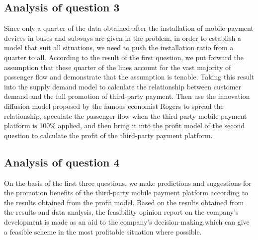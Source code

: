 \documentclass[../mcmpaper]{subfiles}
\begin{document}
\subsection{Analysis of question 3}
Since only a quarter of the data obtained after the installation of mobile payment devices in buses and subways are given in the problem, in order to establish a model that suit all situations, we need to push the installation ratio from a quarter to all. According to the result of the first question, we put forward the assumption that these quarter of the lines account for the vast majority of passenger flow and demonstrate that the assumption is tenable. Taking this result into the supply demand model to calculate the relationship between customer demand and the full promotion of third-party payment. Then use the innovation diffusion model proposed by the famous economist Rogers to spread the relationship, speculate the passenger flow when the third-party mobile payment platform is 100\% applied, and then bring it into the profit model of the second question to calculate the profit of the third-party payment platform. 
\subsection{Analysis of question 4}
On the basis of the first three questions, we make predictions and suggestions for the promotion benefits of the third-party mobile payment platform according to the results obtained from the profit model. Based on the results obtained from the results and data analysis, the feasibility opinion report on the company's development is made as an aid to the company's decision-making.which can give a feasible scheme in the most profitable situation where possible.
\end{document}
